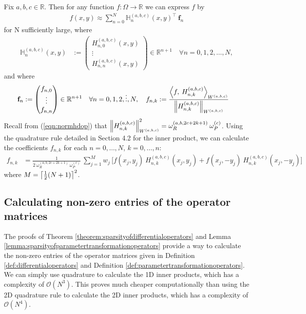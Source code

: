 \documentclass[11pt, oneside]{article}   	%
\newcommand{\bigO}{\mathcal{O}}
\newcommand{\half}{\frac{1}{2}}
\newcommand{\R}{\mathbb{R}}
\newcommand{\hdop}{H}
\newcommand{\bighdop}{\mathbb{\hdop}}
\newcommand{\hdopnk}{\hdop_{n,k}}
\newcommand{\genjac}{R}
\newcommand{\normgenjac}{\omega_\genjac}
\newcommand{\normjac}{\omega_P}
\newcommand{\hdopnkabc}{\hdop_{n,k}^{(a,b,c)}}
\newcommand{\Wabc}{{W^{(a,b,c)}}}
\begin{document}
Fix \(a,b,c \in \R\). Then for any function \(f : \Omega \to \R\) we can express \(f\) by
\begin{align*}
	f(x,y) \approx \sum_{n=0}^N \bighdop_n^{(a,b,c)}(x,y)^\top \: \mathbf{f}_n
\end{align*}
for N sufficiently large, where
\begin{align*}
	\bighdop^{(a,b,c)}_n(x,y) &:= \begin{pmatrix}
		\hdop^{(a,b,c)}_{n,0}(x,y) \\
		\vdots \\
		\hdop^{(a,b,c)}_{n,n}(x,y)
	\end{pmatrix} \in \R^{n+1} \quad \forall n = 0,1,2,\dots,N,
\end{align*}
and where
\begin{align*}
	\mathbf{f}_n &:= \begin{pmatrix}
		f_{n,0} \\
		\vdots \\
		f_{n,n}
	\end{pmatrix} \in \R^{n+1} \quad \forall n = 0,1,2,\dots,N, \quad
	f_{n,k} := \frac{\ip< f, \: \hdopnk^{(a,b,c)}>_{\Wabc}}{\norm{\hdopnk^{(a,b,c)}}_{\Wabc}}
\end{align*}
Recall from (\ref{eqn:normhdop}) that $\norm{\hdopnkabc}^2_\Wabc = \normgenjac^{(a,b,2c+2k+1)} \: \normjac^{(c)}$. Using the quadrature rule detailed in Section 4.2 for the inner product, we can calculate the coefficients $f_{n,k}$ for each $n = 0,\dots,N$, $k = 0,\dots,n$: 
\begin{align*}
	f_{n,k} &= \frac{1}{2 \: \normgenjac^{(a,b,2c+2k+1)} \: \normjac^{(c)}} \: \sum_{j=1}^{M} w_j \: \big[ f(x_j, y_j) \: \hdopnkabc(x_j, y_j) +f(x_j, -y_j) \: \hdopnkabc(x_j, -y_j) \big]
\end{align*}
where $M = \ceil{\half(N+1)}^2$.


\subsection{Calculating non-zero entries of the operator matrices}\label{subsection:Computation-operatormatrices}

The proofs of Theorem \ref{theorem:sparsityofdifferentialoperators} and Lemma \ref{lemma:sparsityofparametertransformationoperators} provide a way to calculate the non-zero entries of the operator matrices given in Definition \ref{def:differentialoperators} and Definition \ref{def:parametertransformationoperators}. We can simply use quadrature to calculate the 1D inner products, which has a complexity of $\bigO(N^3)$. This proves much cheaper computationally than using the 2D quadrature rule to calculate the 2D inner products, which has a complexity of $\bigO(N^4)$. 
\end{document}
